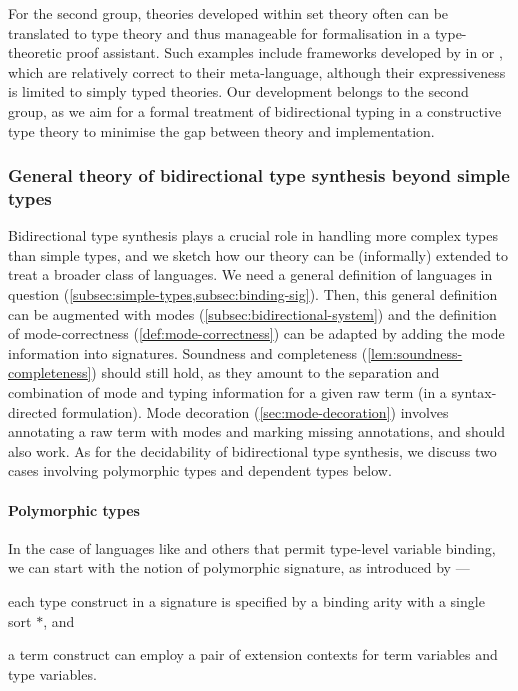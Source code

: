 For the second group, theories developed within set theory often can be translated to type theory and thus manageable for formalisation in a type-theoretic proof assistant. 
Such examples include frameworks developed by \citet{Ahrens2022,Allais2021,Fiore2022} in \Coq or \Agda, which are relatively correct to their meta-language, although their expressiveness is limited to simply typed theories.
Our development belongs to the second group, as we aim for a formal treatment of bidirectional typing in a constructive type theory to minimise the gap between theory and implementation.

\subsubsection{General theory of bidirectional type synthesis beyond simple types}

Bidirectional type synthesis plays a crucial role in handling more complex types than simple types, and we sketch how our theory can be (informally) extended to treat a broader class of languages.
We need a general definition of languages in question (\cref{subsec:simple-types,subsec:binding-sig}).
Then, this general definition can be augmented with modes (\cref{subsec:bidirectional-system}) and the definition of mode-correctness (\cref{def:mode-correctness}) can be adapted by adding the mode information into signatures.
Soundness and completeness (\cref{lem:soundness-completeness}) should still hold, as they amount to the separation and combination of mode and typing information for a given raw term (in a syntax-directed formulation).
Mode decoration (\cref{sec:mode-decoration}) involves annotating a raw term with modes and marking missing annotations, and should also work.
As for the decidability of bidirectional type synthesis, we discuss two cases involving polymorphic types and dependent types below.

\paragraph{Polymorphic types}
In the case of languages like \SystemF and others that permit type-level variable binding, we can start with the notion of polymorphic signature, as introduced by \citet{Hamana2011}---\begin{inlineenum}
  \item each type construct in a signature is specified by a binding arity with a single sort $*$, and
  \item a term construct can employ a pair of extension contexts for term variables and type variables.
\end{inlineenum}

